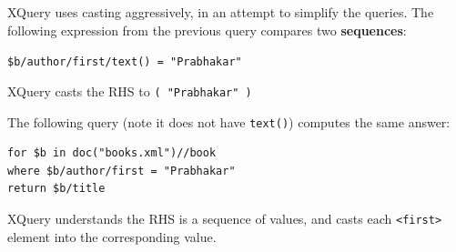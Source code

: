

\begin{frame}[fragile]

XQuery uses \alert{casting} aggressively, in an attempt to simplify the queries. The following expression from the previous query compares two \textbf{sequences}:

\begin{center}
\lstinline[style=XQuery]!$b/author/first/text() = "Prabhakar"!
\end{center}


XQuery casts the RHS to \lstinline[style=XQuery]!( "Prabhakar" )!

The following query (note it does not have \lstinline[style=XQuery]!text()!) computes the same answer:

\begin{lstlisting}[style=XQuery]
for $b in doc("books.xml")//book
where $b/author/first = "Prabhakar"
return $b/title
\end{lstlisting}

XQuery understands the RHS is a sequence of values, and casts each \lstinline[style=XQuery]!<first>! element into the corresponding value.

\end{frame}


